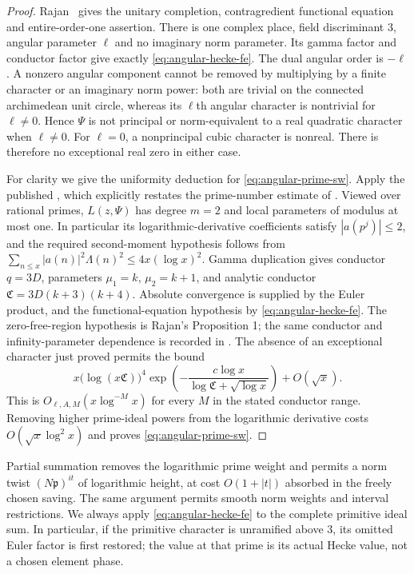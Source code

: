 \begin{proof}
Rajan~\cite[Section 1, pp.\ 281--283]{Rajan1998} gives the
unitary completion, contragredient functional equation and
entire-order-one assertion. There is one complex place, field
discriminant $3$, angular parameter $\ell$ and no imaginary norm
parameter. Its gamma factor and conductor factor give exactly
\eqref{eq:angular-hecke-fe}. The dual angular order is $-\ell$.
A nonzero angular component cannot be removed by multiplying by a
finite character or an imaginary norm power: both are trivial on
the connected archimedean unit circle, whereas its $\ell$th angular
character is nontrivial for $\ell\ne0$. Hence $\Psi$ is not
principal or norm-equivalent to a real quadratic character when
$\ell\ne0$. For $\ell=0$, a nonprincipal cubic character is nonreal.
There is therefore no exceptional real zero in either case.

For clarity we give the uniformity deduction for
\eqref{eq:angular-prime-sw}. Apply the published
\cite[Theorem 1.2]{KanekoThorner2025}, which explicitly restates
the prime-number estimate of \cite[Theorem 5.13]{IwaniecKowalski2004}.
Viewed over rational primes, $L(z,\Psi)$ has degree $m=2$ and
local parameters of modulus at most one. In particular its
logarithmic-derivative coefficients satisfy $|a(p^j)|\le2$, and
the required second-moment hypothesis follows from
$\sum_{n\le x}|a(n)|^2\Lambda(n)^2\le4x(\log x)^2$.
Gamma duplication gives conductor $q=3D$, parameters
$\mu_1=k$, $\mu_2=k+1$, and analytic conductor
$\mathfrak C=3D(k+3)(k+4)$. Absolute convergence is supplied by
the Euler product, and the functional-equation hypothesis by
\eqref{eq:angular-hecke-fe}. The zero-free-region hypothesis is
Rajan's Proposition 1; the same conductor and infinity-parameter
dependence is recorded in
\cite[Lemma 2.1]{ChenParkSwaminathan2015}.
The absence of an exceptional character just proved permits the
bound
\[
 x\bigl(\log(x\mathfrak C)\bigr)^4
   \exp\!\left(-\frac{c\log x}
                         {\log\mathfrak C+\sqrt{\log x}}\right)
       +O(\sqrt x).
\]
This is $O_{\ell,A,M}(x\log^{-M}x)$ for every $M$ in the stated
conductor range. Removing higher prime-ideal powers from the
logarithmic derivative costs $O(\sqrt x\log^2x)$ and proves
\eqref{eq:angular-prime-sw}.
\end{proof}

Partial summation removes the logarithmic prime weight and permits
a norm twist $(N\mathfrak p)^{it}$ of logarithmic height, at cost
$O(1+|t|)$ absorbed in the freely chosen saving. The same argument
permits smooth norm weights and interval restrictions. We always
apply \eqref{eq:angular-hecke-fe} to the complete primitive ideal
sum. In particular, if the primitive character is unramified above
$3$, its omitted Euler factor is first restored; the value at that
prime is its actual Hecke value, not a chosen element phase.

